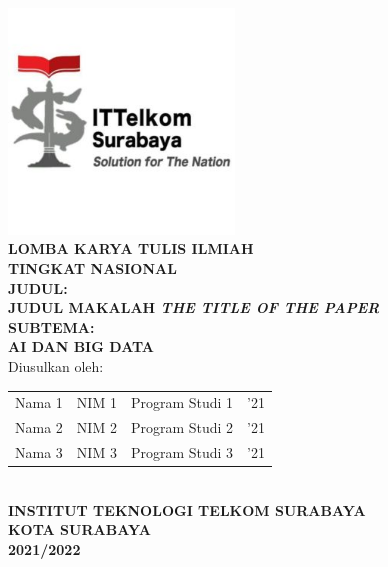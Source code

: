 \begin{titlepage}
\begin{center}
\includegraphics[width=6cm, height=6cm]{Image/itts.jpg}\\
    \Large \textbf{LOMBA KARYA TULIS ILMIAH}\\
    \textbf{TINGKAT NASIONAL}\\
    \vspace*{1cm}
    \large\textbf{JUDUL:}\\
    \textbf{JUDUL MAKALAH \textit{THE TITLE OF THE PAPER}}\\
    \vspace*{.5cm}
    \textbf{SUBTEMA:}\\
    \textbf{AI DAN BIG DATA}\\
    \vspace*{3cm}
    \normalsize Diusulkan oleh:\\
    \vspace*{.2cm}
    \begin{tabular}{lccc}
         Nama 1 & NIM 1 & Program Studi 1 & '21 \\
         Nama 2 & NIM 2 & Program Studi 2 & '21 \\
         Nama 3 & NIM 3 & Program Studi 3 & '21
    \end{tabular}
    \\
    \vspace*{3cm}
    \large \textbf{INSTITUT TEKNOLOGI TELKOM SURABAYA\\
    KOTA SURABAYA\\
    2021/2022}
\end{center}
\end{titlepage}

